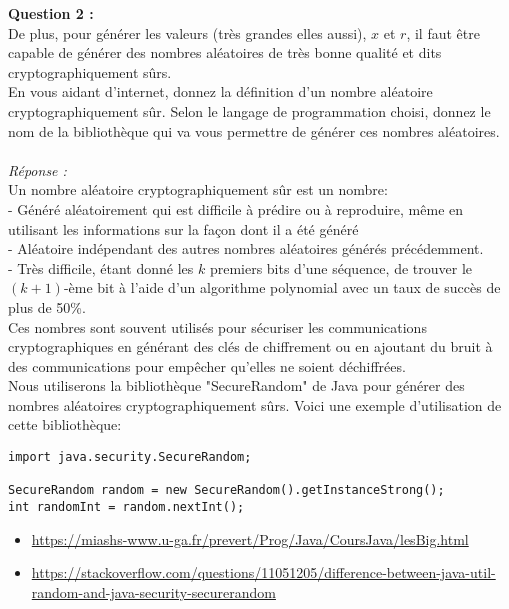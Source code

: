 \documentclass[a4paper,11pt]{article}
\begin{document}
    \label{subsec:Q2}
    \textbf{Question 2 : \\}De plus, pour générer les valeurs (très grandes elles aussi), $x$ et $r$, il faut être capable de générer des nombres aléatoires de très bonne qualité et dits cryptographiquement sûrs.\\En vous aidant d’internet, donnez la définition d’un nombre aléatoire cryptographiquement sûr. Selon le langage de programmation choisi, donnez le nom de la bibliothèque qui va vous permettre de générer ces nombres aléatoires.\\ \textit{\\Réponse :}\\Un nombre aléatoire cryptographiquement sûr est un nombre:\\ - Généré aléatoirement qui est difficile à prédire ou à reproduire, même en utilisant les informations sur la façon dont il a été généré\\ - Aléatoire indépendant des autres nombres aléatoires générés précédemment.\\ - Très difficile, étant donné les $k$ premiers bits d'une séquence, de trouver le $(k+1)$-ème bit à l'aide d'un algorithme polynomial avec un taux de succès de plus de 50\%.\\ Ces nombres sont souvent utilisés pour sécuriser les communications cryptographiques en générant des clés de chiffrement ou en ajoutant du bruit à des communications pour empêcher qu'elles ne soient déchiffrées.\\
    Nous utiliserons la bibliothèque "SecureRandom" de Java pour générer des nombres aléatoires cryptographiquement sûrs. Voici une exemple d'utilisation de cette bibliothèque: \begin{lstlisting}
import java.security.SecureRandom;

SecureRandom random = new SecureRandom().getInstanceStrong();
int randomInt = random.nextInt();

    \end{lstlisting}
    \begin{itemize}
        \item \url{https://miashs-www.u-ga.fr/prevert/Prog/Java/CoursJava/lesBig.html}
        \item \url{https://stackoverflow.com/questions/11051205/difference-between-java-util-random-and-java-security-securerandom}
    \end{itemize}
\end{document}
